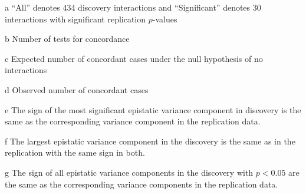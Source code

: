 \documentclass{article}
\begin{document}
\begin{table}[ht]
\begin{threeparttable}
\begin{tablenotes}
\item[a] ``All'' denotes 434 discovery interactions and ``Significant'' denotes 30 interactions with significant replication $p$-values
\item[b] Number of tests for concordance
\item[c] Expected number of concordant cases under the null hypothesis of no interactions
\item[d] Observed number of concordant cases
\item[e] The sign of the most significant epistatic variance component in discovery is the same as the corresponding variance component in the replication data.
\item[f] The largest epistatic variance component in the discovery is the same as in the replication with the same sign in both.
\item[g] The sign of all epistatic variance components in the discovery with $p < 0.05$ are the same as the corresponding variance components in the replication data.
\end{tablenotes}

\end{threeparttable}
\end{table}
\end{document}
